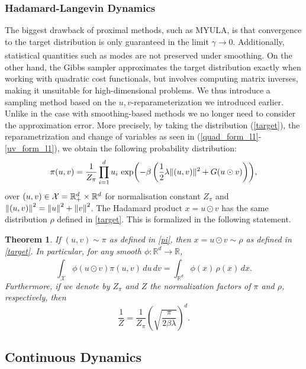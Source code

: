 \documentclass{article}
\newtheorem{theorem}{Theorem}[section]
\begin{document}
\subsubsection{Hadamard-Langevin Dynamics}
The biggest drawback of proximal methods, such as MYULA, is that convergence to the target distribution is only guaranteed in the limit $\gamma \xrightarrow[]{} 0$. Additionally, statistical quantities such as modes are not preserved under smoothing. On the other hand, the Gibbs sampler approximates the target distribution exactly when working with quadratic cost functionals, but involves computing matrix inverses, making it unsuitable for high-dimensional problems. We thus introduce a sampling method based on the $u,v$-reparameterization we introduced earlier. Unlike in the case with smoothing-based methods we no longer need to consider the approximation error. More precisely, by taking the distribution (\ref{target}), the reparametrization and change of variables as seen in (\ref{quad_form_l1}-\ref{uv_form_l1}), we obtain the following probability distribution:
\begin{align}
\pi(u,v)=\frac{1}{Z_\pi} \prod_{i=1}^d  u_i\, \exp\pp{-\beta\, \pp{\frac12\lambda \|(u,v)\|^2+G(u\odot v)} },\label{pi}
\end{align}
over $(u,v)\in \mathcal X= \mathbb{R}_+^d\times \mathbb {R}^d$ for normalisation constant $Z_\pi$ and $\left\lVert(u,v)\right\rVert^2=\left\lVert u\right\rVert^2+\left\lVert v\right\rVert^2$. The Hadamard  product $x=u\odot v$ has the same distribution $\rho$ defined in \ref{target}. This is formalized in the following statement.





\begin{theorem}\label{thm:overparam}If $(u,v)\sim \pi$ as defined in \ref{pi}, then $x=u \odot v\sim\rho$ as defined in \ref{target}. In particular, for any smooth $\phi:\mathbb{R}^d \xrightarrow[]{} \mathbb{R}$,
    \[\int_{\mathcal X} \phi(u \odot v) \pi(u,v)\,du\,dv = \int_{\mathbb{R}^
    d} \phi(x) \,\rho(x)\,dx.\]
    Furthermore, if we denote by $Z_\pi$ and $Z$ the normalization factors of $\pi$ and $\rho$, respectively, then
    \[\frac{1}{Z} = \frac{1}{Z_\pi} \left(\sqrt{\frac{\pi}{2\beta \lambda}}\right)^d.\]
\end{theorem}

\subsection{Continuous Dynamics}
\end{document}
